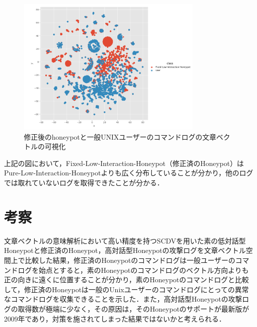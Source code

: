 \vspace{3mm}
\begin{figure}[htbp]
    \centering
    \includegraphics[width=0.8\textwidth]{figures/fixuser.png}
    \caption{修正後のhoneypotと一般UNIXユーザーのコマンドログの文章ベクトルの可視化}
    \label{fig:tsne3}
\end{figure}
\vspace{1mm}
\clearpage

上記の図において，Fixed-Low-Interaction-Honeypot（修正済のHoneypot）はPure-Low-Interaction-Honeypotよりも広く分布していることが分かり，他のログでは取れていないログを取得できたことが分かる．


\section{考察}
\label{eval:implkosatu}
文章ベクトルの意味解析において高い精度を持つ\cite{scdv}SCDVを用いた素の低対話型Honeypotと修正済のHoneypot，高対話型Honeypotの攻撃ログを文章ベクトル空間上で比較した結果，修正済のHoneypotのコマンドログは一般ユーザーのコマンドログを始点とすると，素のHoneypotのコマンドログのベクトル方向よりも正の向きに遠くに位置することが分かり，素のHoneypotのコマンドログと比較して，修正済のHoneypotは一般のUnixユーザーのコマンドログにとっての異常なコマンドログを収集できることを示した．また，高対話型Honeypotの攻撃ログの取得数が極端に少なく，その原因は，そのHoneypotのサポートが最新版が2009年であり，対策を施されてしまった結果ではないかと考えられる．









